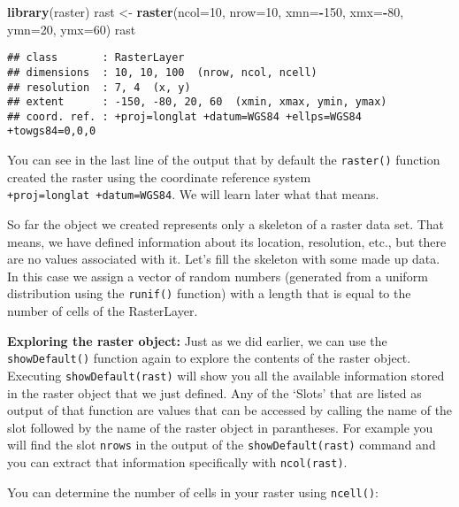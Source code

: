 \documentclass[]{article}
\newenvironment{Shaded}{\begin{snugshade}}{\end{snugshade}}
\newcommand{\DataTypeTok}[1]{\textcolor[rgb]{0.13,0.29,0.53}{#1}}
\newcommand{\DecValTok}[1]{\textcolor[rgb]{0.00,0.00,0.81}{#1}}
\newcommand{\KeywordTok}[1]{\textcolor[rgb]{0.13,0.29,0.53}{\textbf{#1}}}
\newcommand{\NormalTok}[1]{#1}
\newcommand{\OperatorTok}[1]{\textcolor[rgb]{0.81,0.36,0.00}{\textbf{#1}}}
\newcommand{\StringTok}[1]{\textcolor[rgb]{0.31,0.60,0.02}{#1}}
\begin{document}
\begin{Shaded}
\begin{Highlighting}[]
\KeywordTok{library}\NormalTok{(raster)}
\NormalTok{rast <-}\StringTok{ }\KeywordTok{raster}\NormalTok{(}\DataTypeTok{ncol=}\DecValTok{10}\NormalTok{, }\DataTypeTok{nrow=}\DecValTok{10}\NormalTok{, }\DataTypeTok{xmn=}\OperatorTok{-}\DecValTok{150}\NormalTok{, }\DataTypeTok{xmx=}\OperatorTok{-}\DecValTok{80}\NormalTok{, }\DataTypeTok{ymn=}\DecValTok{20}\NormalTok{, }\DataTypeTok{ymx=}\DecValTok{60}\NormalTok{)}
\NormalTok{rast}
\end{Highlighting}
\end{Shaded}

\begin{verbatim}
## class       : RasterLayer 
## dimensions  : 10, 10, 100  (nrow, ncol, ncell)
## resolution  : 7, 4  (x, y)
## extent      : -150, -80, 20, 60  (xmin, xmax, ymin, ymax)
## coord. ref. : +proj=longlat +datum=WGS84 +ellps=WGS84 +towgs84=0,0,0
\end{verbatim}

You can see in the last line of the output that by default the
\texttt{raster()} function created the raster using the coordinate
reference system \texttt{+proj=longlat\ +datum=WGS84}. We will learn
later what that means.

So far the object we created represents only a skeleton of a raster data
set. That means, we have defined information about its location,
resolution, etc., but there are no values associated with it. Let's fill
the skeleton with some made up data. In this case we assign a vector of
random numbers (generated from a uniform distribution using the
\texttt{runif()} function) with a length that is equal to the number of
cells of the RasterLayer.

\textbf{Exploring the raster object:} Just as we did earlier, we can use
the \texttt{showDefault()} function again to explore the contents of the
raster object. Executing \texttt{showDefault(rast)} will show you all
the available information stored in the raster object that we just
defined. Any of the `Slots' that are listed as output of that function
are values that can be accessed by calling the name of the slot followed
by the name of the raster object in parantheses. For example you will
find the slot \texttt{nrows} in the output of the
\texttt{showDefault(rast)} command and you can extract that information
specifically with \texttt{ncol(rast)}.

You can determine the number of cells in your raster using
\texttt{ncell()}:
\end{document}
